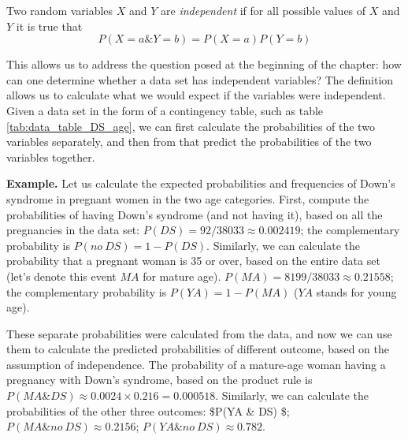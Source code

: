 \documentclass[
  letterpaper,
  DIV=11,
  numbers=noendperiod]{scrreprt}
\begin{document}
\begin{tcolorbox}[enhanced jigsaw, arc=.35mm, colframe=quarto-callout-note-color-frame, left=2mm, opacitybacktitle=0.6, breakable, title=\textcolor{quarto-callout-note-color}{\faInfo}\hspace{0.5em}{Definition}, toprule=.15mm, coltitle=black, bottomtitle=1mm, toptitle=1mm, colback=white, leftrule=.75mm, colbacktitle=quarto-callout-note-color!10!white, titlerule=0mm, opacityback=0, rightrule=.15mm, bottomrule=.15mm]

Two random variables \(X\) and \(Y\) are \emph{independent} if for all
possible values of \(X\) and \(Y\) it is true that
\[ P(X=a \& Y=b) = P(X=a)P(Y=b)\]

\end{tcolorbox}

This allows us to address the question posed at the beginning of the
chapter: how can one determine whether a data set has independent
variables? The definition allows us to calculate what we would expect if
the variables were independent. Given a data set in the form of a
contingency table, such as table \ref{tab:data_table_DS_age}, we can
first calculate the probabilities of the two variables separately, and
then from that predict the probabilities of the two variables together.

\textbf{Example.} Let us calculate the expected probabilities and
frequencies of Down's syndrome in pregnant women in the two age
categories. First, compute the probabilities of having Down's syndrome
(and not having it), based on all the pregnancies in the data set:
\(P(DS) = 92/38033 \approx 0.002419\); the complementary probability is
\(P(no \ DS) = 1 - P(DS)\). Similarly, we can calculate the probability
that a pregnant woman is 35 or over, based on the entire data set (let's
denote this event \(MA\) for mature age).
\(P(MA) = 8199/38033 \approx 0.21558\); the complementary probability is
\(P(YA) = 1 - P(MA)\) (\(YA\) stands for young age).

These separate probabilities were calculated from the data, and now we
can use them to calculate the predicted probabilities of different
outcome, based on the assumption of independence. The probability of a
mature-age woman having a pregnancy with Down's syndrome, based on the
product rule is \(P(MA \& DS) \approx 0.0024 \times 0.216 = 0.000518\).
Similarly, we can calculate the probabilities of the other three
outcomes: \$P(YA \& DS)  \$;
\(P(MA \& no \ DS) \approx 0.2156\); \(P(YA \& no \ DS) \approx 0.782\).
\end{document}
